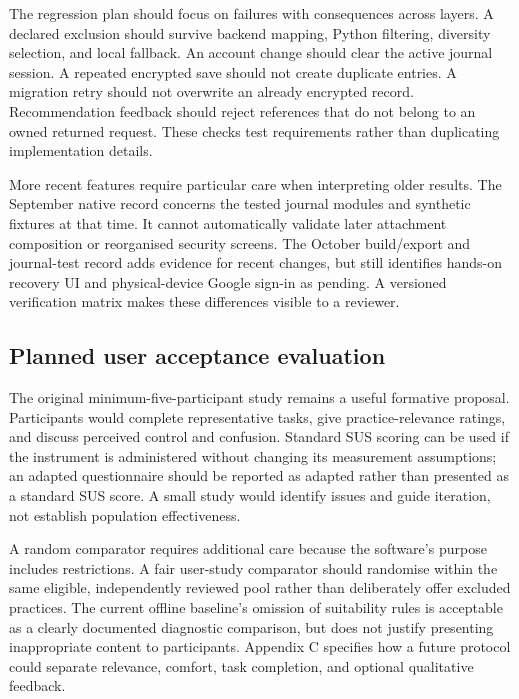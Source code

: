 The regression plan should focus on failures with consequences across layers. A declared exclusion should survive backend mapping, Python filtering, diversity selection, and local fallback. An account change should clear the active journal session. A repeated encrypted save should not create duplicate entries. A migration retry should not overwrite an already encrypted record. Recommendation feedback should reject references that do not belong to an owned returned request. These checks test requirements rather than duplicating implementation details.

More recent features require particular care when interpreting older results. The September native record concerns the tested journal modules and synthetic fixtures at that time. It cannot automatically validate later attachment composition or reorganised security screens. The October build/\allowbreak{}export and journal-test record adds evidence for recent changes, but still identifies hands-on recovery UI and physical-device Google sign-in as pending. A versioned verification matrix makes these differences visible to a reviewer.

\subsection{Planned user acceptance evaluation}

The original minimum-five-participant study remains a useful formative proposal. Participants would complete representative tasks, give practice-relevance ratings, and discuss perceived control and confusion. Standard SUS scoring can be used if the instrument is administered without changing its measurement assumptions; an adapted questionnaire should be reported as adapted rather than presented as a standard SUS score. A small study would identify issues and guide iteration, not establish population effectiveness.

A random comparator requires additional care because the software's purpose includes restrictions. A fair user-study comparator should randomise within the same eligible, independently reviewed pool rather than deliberately offer excluded practices. The current offline baseline's omission of suitability rules is acceptable as a clearly documented diagnostic comparison, but does not justify presenting inappropriate content to participants. Appendix C specifies how a future protocol could separate relevance, comfort, task completion, and optional qualitative feedback.
